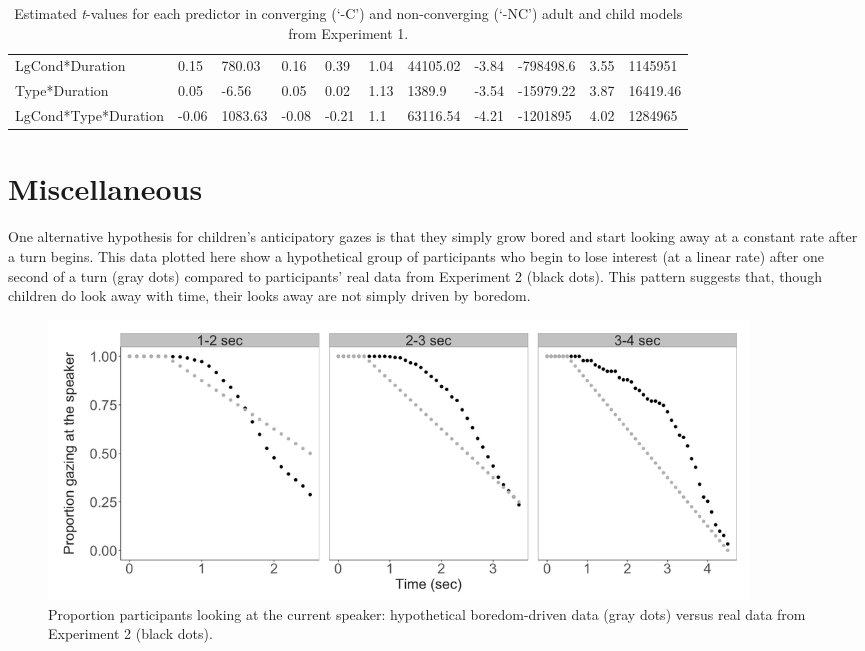\documentclass[authoryear, 12pt]{elsarticle}
\begin{document}
\begin{table}
\begin{scriptsize}
\begin{tabular}{lllllllllll}
    LgCond*Duration  		& 0.15	& 780.03		& 0.16	& 0.39	& 1.04	& 44105.02	& -3.84	& -798498.6	& 3.55	& 1145951	\\
    Type*Duration 			& 0.05	& -6.56		& 0.05	& 0.02	& 1.13	& 1389.9		& -3.54	& -15979.22	& 3.87	& 16419.46	\\
    LgCond*Type*Duration  	& -0.06	& 1083.63		& -0.08	& -0.21	& 1.1		& 63116.54	& -4.21	& -1201895	& 4.02	& 1284965	\\
    \hline
  \end{tabular}
  \caption{Estimated \textit{t}-values for each predictor in converging (`-C') and non-converging (`-NC') adult and child models from Experiment 1. }
\label{tab:nonconv_e1}
 \end{scriptsize}
\end{table}

\clearpage

\section{Miscellaneous}
\setcounter{figure}{0}  

One alternative hypothesis for children's anticipatory gazes is that they simply grow bored and start looking away at a constant rate after a turn begins. This data plotted here show a hypothetical group of participants who begin to lose interest (at a linear rate) after one second of a turn (gray dots) compared to participants' real data from Experiment 2 (black dots). This pattern suggests that, though children do look away with time, their looks away are not simply driven by boredom.

\begin{figure}[!htb]
\begin{center}
\includegraphics[width=0.9\textwidth]{figures/boredom-hypothesis.png}
\end{center}
\caption{Proportion participants looking at the current speaker: hypothetical boredom-driven data (gray dots) versus real data from Experiment 2 (black dots).} 
\label{fig:boredomhypothesis}
\end{figure}
\end{document}
